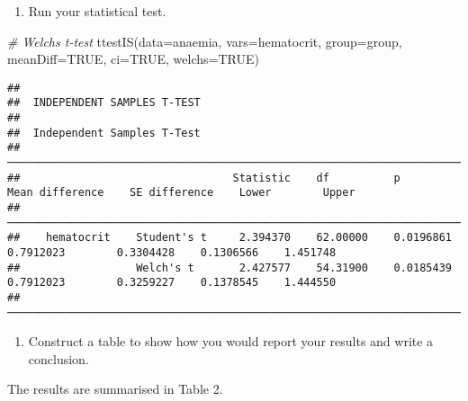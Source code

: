 \documentclass[
]{memoir}
\newenvironment{Shaded}{\begin{snugshade}}{\end{snugshade}}
\newcommand{\AttributeTok}[1]{\textcolor[rgb]{0.77,0.63,0.00}{#1}}
\newcommand{\CommentTok}[1]{\textcolor[rgb]{0.56,0.35,0.01}{\textit{#1}}}
\newcommand{\ConstantTok}[1]{\textcolor[rgb]{0.00,0.00,0.00}{#1}}
\newcommand{\FunctionTok}[1]{\textcolor[rgb]{0.00,0.00,0.00}{#1}}
\newcommand{\NormalTok}[1]{#1}
\providecommand{\tightlist}{%
  \setlength{\itemsep}{0pt}\setlength{\parskip}{0pt}}
\begin{document}
\begin{enumerate}
\def\labelenumi{\alph{enumi})}
\setcounter{enumi}{2}
\tightlist
\item
  Run your statistical test.
\end{enumerate}

\begin{Shaded}
\begin{Highlighting}[]
\CommentTok{\# Welch\textquotesingle{}s t{-}test}
\FunctionTok{ttestIS}\NormalTok{(}\AttributeTok{data=}\NormalTok{anaemia, }\AttributeTok{vars=}\NormalTok{hematocrit, }\AttributeTok{group=}\NormalTok{group, }\AttributeTok{meanDiff=}\ConstantTok{TRUE}\NormalTok{, }\AttributeTok{ci=}\ConstantTok{TRUE}\NormalTok{, }\AttributeTok{welchs=}\ConstantTok{TRUE}\NormalTok{)}
\end{Highlighting}
\end{Shaded}

\begin{verbatim}
## 
##  INDEPENDENT SAMPLES T-TEST
## 
##  Independent Samples T-Test                                                                                                       
##  ──────────────────────────────────────────────────────────────────────────────────────────────────────────────────────────────── 
##                                 Statistic    df          p            Mean difference    SE difference    Lower        Upper      
##  ──────────────────────────────────────────────────────────────────────────────────────────────────────────────────────────────── 
##    hematocrit    Student's t     2.394370    62.00000    0.0196861          0.7912023        0.3304428    0.1306566    1.451748   
##                  Welch's t       2.427577    54.31900    0.0185439          0.7912023        0.3259227    0.1378545    1.444550   
##  ────────────────────────────────────────────────────────────────────────────────────────────────────────────────────────────────
\end{verbatim}

\begin{enumerate}
\def\labelenumi{\alph{enumi})}
\setcounter{enumi}{3}
\tightlist
\item
  Construct a table to show how you would report your results and write a conclusion.
\end{enumerate}

The results are summarised in Table 2.
\end{document}

